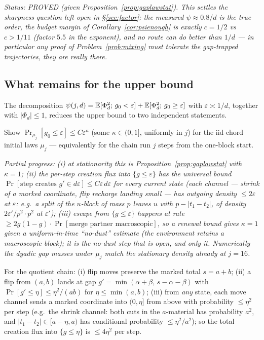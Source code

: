 \emph{Status: PROVED (given Proposition~\ref{prop:gaplawstat}).  This
settles the sharpness question left open in \S\ref{sec:factor}: the
measured $\psi\approx0.8/d$ is the true order, the budget margin of
Corollary~\ref{cor:psienough} is exactly $c=1/2$ vs $c>1/11$
(factor $5.5$ in the exponent), and no route can do better than
$1/d$ --- in particular any proof of Problem~\ref{prob:mixing} must
tolerate the gap-trapped trajectories, they are really there.}

\subsection{What remains for the upper bound}
\label{sec:upper}

The decomposition
$\psi(j,d)=\mathbb{E}[\Phi_d^2;\,g_0<\varepsilon]+\mathbb{E}[\Phi_d^2;\,g_0\ge
\varepsilon]$ with $\varepsilon\asymp1/d$, together with
$|\Phi_d|\le1$, reduces the upper bound to two independent
statements.

\begin{problem}\label{prob:gaplaw}
Show $\Pr_{\mu_j}[g_0\le\varepsilon]\le C\varepsilon^{\kappa}$ (some
$\kappa\in(0,1]$, uniformly in $j$) for the iid-chord initial laws
$\mu_j$ --- equivalently for the chain run $j$ steps from the
one-block start.
\end{problem}

\emph{Partial progress: (i) at stationarity this is
Proposition~\ref{prop:gaplawstat} with $\kappa=1$; (ii) the per-step
\emph{creation} flux into $\{g\le\varepsilon\}$ has the universal
bound $\Pr[\text{step creates }g'\in d\varepsilon]\le
C\varepsilon\,d\varepsilon$ for every current state (each channel ---
shrink of a marked coordinate, flip recharge landing small --- has
outgoing density $\le2\varepsilon$ at $\varepsilon$: e.g.\ a split of
the $u$-block of mass $p$ leaves $u$ with $p-|t_1-t_2|$, of density
$2\varepsilon'/p^2\cdot p^2$ at $\varepsilon'$); (iii) escape from
$\{g\le\varepsilon\}$ happens at rate $\ge2g(1-g)\cdot
\Pr[\text{merge partner macroscopic}]$, so a renewal bound gives
$\kappa=1$ \emph{given} a uniform-in-time ``no-dust'' estimate (the
environment retains a macroscopic block); it is the no-dust step that
is open, and only it.  Numerically the dyadic gap masses under
$\mu_j$ match the stationary density already at $j=16$.}

\begin{lemma}\label{lem:recharge}
For the quotient chain: (i) flip moves preserve the marked total
$s=a+b$; (ii) a flip from $(a,b)$ lands at gap
$g'=\min(\alpha+\beta,\,s-\alpha-\beta)$ with
$\Pr[g'\le\eta]\le\eta^2/(ab)$ for $\eta\le\min(a,b)$; (iii) from
\emph{any} state, each move channel sends a marked coordinate into
$(0,\eta]$ from above with probability $\le\eta^2$ per step (e.g.\
the shrink channel: both cuts in the $a$-material has probability
$a^2$, and $|t_1-t_2|\in[a-\eta,a)$ has conditional probability
$\le\eta^2/a^2$); so the total creation flux into
$\{g\le\eta\}$ is $\le4\eta^2$ per step.
\end{lemma}

